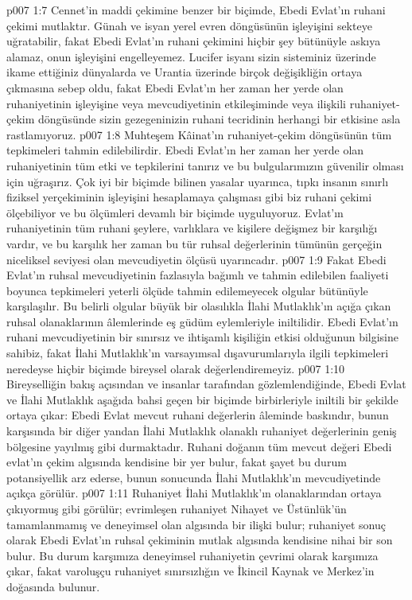 \vs p007 1:7 Cennet’in maddi çekimine benzer bir biçimde, Ebedi Evlat’ın ruhani çekimi mutlaktır. Günah ve isyan yerel evren döngüsünün işleyişini sekteye uğratabilir, fakat Ebedi Evlat’ın ruhani çekimini hiçbir şey bütünüyle askıya alamaz, onun işleyişini engelleyemez. Lucifer isyanı sizin sisteminiz üzerinde ikame ettiğiniz dünyalarda ve Urantia üzerinde birçok değişikliğin ortaya çıkmasına sebep oldu, fakat Ebedi Evlat’ın her zaman her yerde olan ruhaniyetinin işleyişine veya mevcudiyetinin etkileşiminde veya ilişkili ruhaniyet\hyp{}çekim döngüsünde sizin gezegeninizin ruhani tecridinin herhangi bir etkisine asla rastlamıyoruz.
\vs p007 1:8 Muhteşem Kâinat’ın ruhaniyet\hyp{}çekim döngüsünün tüm tepkimeleri tahmin edilebilirdir. Ebedi Evlat’ın her zaman her yerde olan ruhaniyetinin tüm etki ve tepkilerini tanırız ve bu bulgularımızın güvenilir olması için uğraşırız. Çok iyi bir biçimde bilinen yasalar uyarınca, tıpkı insanın sınırlı fiziksel yerçekiminin işleyişini hesaplamaya çalışması gibi biz ruhani çekimi ölçebiliyor ve bu ölçümleri devamlı bir biçimde uyguluyoruz. Evlat’ın ruhaniyetinin tüm ruhani şeylere, varlıklara ve kişilere değişmez bir karşılığı vardır, ve bu karşılık her zaman bu tür ruhsal değerlerinin tümünün gerçeğin niceliksel seviyesi olan mevcudiyetin ölçüsü uyarıncadır.
\vs p007 1:9 Fakat Ebedi Evlat’ın ruhsal mevcudiyetinin fazlasıyla bağımlı ve tahmin edilebilen faaliyeti boyunca tepkimeleri yeterli ölçüde tahmin edilemeyecek olgular bütünüyle karşılaşılır. Bu belirli olgular büyük bir olasılıkla İlahi Mutlaklık’ın açığa çıkan ruhsal olanaklarının âlemlerinde eş güdüm eylemleriyle iniltilidir. Ebedi Evlat’ın ruhani mevcudiyetinin bir sınırsız ve ihtişamlı kişiliğin etkisi olduğunun bilgisine sahibiz, fakat İlahi Mutlaklık’ın varsayımsal dışavurumlarıyla ilgili tepkimeleri neredeyse hiçbir biçimde bireysel olarak değerlendiremeyiz.
\vs p007 1:10 Bireyselliğin bakış açısından ve insanlar tarafından gözlemlendiğinde, Ebedi Evlat ve İlahi Mutlaklık aşağıda bahsi geçen bir biçimde birbirleriyle iniltili bir şekilde ortaya çıkar: Ebedi Evlat mevcut ruhani değerlerin âleminde baskındır, bunun karşısında bir diğer yandan İlahi Mutlaklık olanaklı ruhaniyet değerlerinin geniş bölgesine yayılmış gibi durmaktadır. Ruhani doğanın tüm mevcut değeri Ebedi evlat’ın çekim algısında kendisine bir yer bulur, fakat şayet bu durum potansiyellik arz ederse, bunun sonucunda İlahi Mutlaklık’ın mevcudiyetinde açıkça görülür.
\vs p007 1:11 Ruhaniyet İlahi Mutlaklık’ın olanaklarından ortaya çıkıyormuş gibi görülür; evrimleşen ruhaniyet Nihayet ve Üstünlük’ün tamamlanmamış ve deneyimsel olan algısında bir ilişki bulur; ruhaniyet sonuç olarak Ebedi Evlat’ın ruhsal çekiminin mutlak algısında kendisine nihai bir son bulur. Bu durum karşımıza deneyimsel ruhaniyetin çevrimi olarak karşımıza çıkar, fakat varoluşçu ruhaniyet sınırsızlığın ve İkincil Kaynak ve Merkez’in doğasında bulunur.
